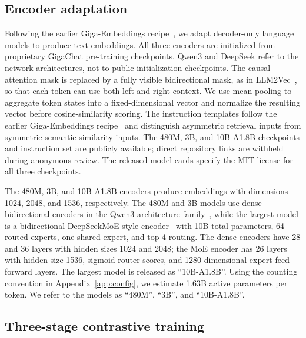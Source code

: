 \documentclass[11pt]{article}
\begin{document}
\subsection{Encoder adaptation}

Following the earlier Giga-Embeddings recipe~\citep{kolodin2025gigaembeddings}, we adapt decoder-only language models to produce text embeddings.
All three encoders are initialized from proprietary GigaChat pre-training checkpoints.
Qwen3 and DeepSeek refer to the network architectures, not to public initialization checkpoints.
The causal attention mask is replaced by a fully visible bidirectional mask, as in LLM2Vec~\citep{behnamghader2024llm2vec}, so that each token can use both left and right context.
We use mean pooling to aggregate token states into a fixed-dimensional vector and normalize the resulting vector before cosine-similarity scoring.
The instruction templates follow the earlier Giga-Embeddings recipe~\citep{kolodin2025gigaembeddings} and distinguish asymmetric retrieval inputs from symmetric semantic-similarity inputs.
The 480M, 3B, and 10B-A1.8B checkpoints and instruction set are publicly available; direct repository links are withheld during anonymous review.
The released model cards specify the MIT license for all three checkpoints.

The 480M, 3B, and 10B-A1.8B encoders produce embeddings with dimensions 1024, 2048, and 1536, respectively.
The 480M and 3B models use dense bidirectional encoders in the Qwen3 architecture family~\citep{zhang2025qwen3embedding}, while the largest model is a bidirectional DeepSeekMoE-style encoder~\citep{dai2024deepseekmoe} with 10B total parameters, 64 routed experts, one shared expert, and top-4 routing.
The dense encoders have 28 and 36 layers with hidden sizes 1024 and 2048; the MoE encoder has 26 layers with hidden size 1536, sigmoid router scores, and 1280-dimensional expert feed-forward layers.
The largest model is released as ``10B-A1.8B''.
Using the counting convention in Appendix~\ref{app:config}, we estimate 1.63B active parameters per token.
We refer to the models as ``480M'', ``3B'', and ``10B-A1.8B''.

\subsection{Three-stage contrastive training}
\end{document}
